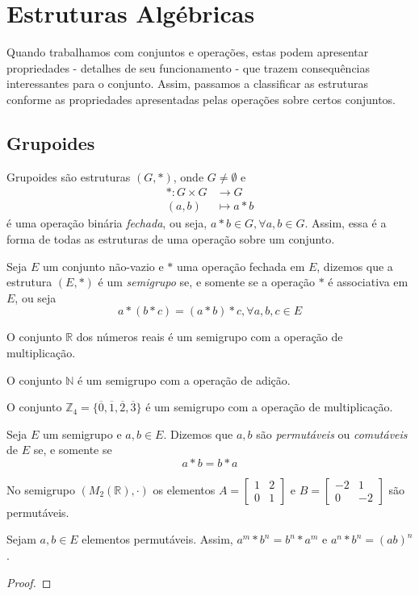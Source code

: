 \chapter{Estruturas Algébricas}
Quando trabalhamos com conjuntos e operações, estas podem apresentar propriedades - detalhes de seu funcionamento - que trazem consequências interessantes para o conjunto. Assim, passamos a classificar as estruturas conforme as propriedades apresentadas pelas operações sobre certos conjuntos.

\section{Grupoides}
Grupoides são estruturas $(G,*)$, onde $G\neq\emptyset$ e \begin{align*}
* : G \times G &\longrightarrow G \\
(a,b) &\longmapsto a*b
\end{align*} é uma operação binária \emph{fechada}, ou seja, $a*b\in G, \forall a,b \in G$. Assim, essa é a forma de todas as estruturas de uma operação sobre um conjunto.

\begin{df}
Seja $E$ um conjunto não-vazio e $*$ uma operação fechada em $E$, dizemos que a estrutura $(E,*)$ é um \emph{semigrupo} se, e somente se a operação $*$ é associativa em $E$, ou seja
\[a*(b*c)=(a*b)*c, \forall a,b,c \in E\]
\end{df}
\begin{exemplo}
O conjunto $\mathbb{R}$ dos números reais é um semigrupo com a operação de multiplicação. \par O conjunto $\mathbb{N}$ é um semigrupo com a operação de adição. \par O conjunto $\mathbb{Z}_4=\{\overline{0},\overline{1},\overline{2},\overline{3}\}$ é um semigrupo com a operação de multiplicação.
\end{exemplo}

\begin{df}
Seja $E$ um semigrupo e $a,b \in E$. Dizemos que $a,b$ são \emph{permutáveis} ou \emph{comutáveis} de $E$ se, e somente se \[a*b=b*a\]
\end{df}
\begin{exemplo}
No semigrupo $\left(M_2(\mathbb{R}), \cdot \right)$ os elementos $A=\begin{bmatrix}
1 & 2 \\
0 & 1
\end{bmatrix}$ e $B=\begin{bmatrix}
-2 & 1 \\
0 & -2
\end{bmatrix}$ são permutáveis.
\end{exemplo}
\begin{prop}
Sejam $a,b \in E$ elementos permutáveis. Assim, $a^m*b^n=b^n*a^m$ e $a^n*b^n=(ab)^n$.
\begin{proof}

\end{proof}
\end{prop}


